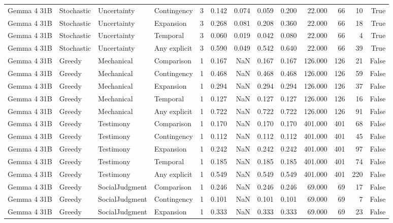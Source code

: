 \begin{tabular}{llllrrrrrrrrr}
Gemma 4 31B & Stochastic & Uncertainty & Contingency & 3 & 0.142 & 0.074 & 0.059 & 0.200 & 22.000 & 66 & 10 & True \\
Gemma 4 31B & Stochastic & Uncertainty & Expansion & 3 & 0.268 & 0.081 & 0.208 & 0.360 & 22.000 & 66 & 18 & True \\
Gemma 4 31B & Stochastic & Uncertainty & Temporal & 3 & 0.060 & 0.019 & 0.042 & 0.080 & 22.000 & 66 & 4 & True \\
Gemma 4 31B & Stochastic & Uncertainty & Any explicit & 3 & 0.590 & 0.049 & 0.542 & 0.640 & 22.000 & 66 & 39 & True \\
Gemma 4 31B & Greedy & Mechanical & Comparison & 1 & 0.167 & NaN & 0.167 & 0.167 & 126.000 & 126 & 21 & False \\
Gemma 4 31B & Greedy & Mechanical & Contingency & 1 & 0.468 & NaN & 0.468 & 0.468 & 126.000 & 126 & 59 & False \\
Gemma 4 31B & Greedy & Mechanical & Expansion & 1 & 0.294 & NaN & 0.294 & 0.294 & 126.000 & 126 & 37 & False \\
Gemma 4 31B & Greedy & Mechanical & Temporal & 1 & 0.127 & NaN & 0.127 & 0.127 & 126.000 & 126 & 16 & False \\
Gemma 4 31B & Greedy & Mechanical & Any explicit & 1 & 0.722 & NaN & 0.722 & 0.722 & 126.000 & 126 & 91 & False \\
Gemma 4 31B & Greedy & Testimony & Comparison & 1 & 0.170 & NaN & 0.170 & 0.170 & 401.000 & 401 & 68 & False \\
Gemma 4 31B & Greedy & Testimony & Contingency & 1 & 0.112 & NaN & 0.112 & 0.112 & 401.000 & 401 & 45 & False \\
Gemma 4 31B & Greedy & Testimony & Expansion & 1 & 0.242 & NaN & 0.242 & 0.242 & 401.000 & 401 & 97 & False \\
Gemma 4 31B & Greedy & Testimony & Temporal & 1 & 0.185 & NaN & 0.185 & 0.185 & 401.000 & 401 & 74 & False \\
Gemma 4 31B & Greedy & Testimony & Any explicit & 1 & 0.549 & NaN & 0.549 & 0.549 & 401.000 & 401 & 220 & False \\
Gemma 4 31B & Greedy & SocialJudgment & Comparison & 1 & 0.246 & NaN & 0.246 & 0.246 & 69.000 & 69 & 17 & False \\
Gemma 4 31B & Greedy & SocialJudgment & Contingency & 1 & 0.101 & NaN & 0.101 & 0.101 & 69.000 & 69 & 7 & False \\
Gemma 4 31B & Greedy & SocialJudgment & Expansion & 1 & 0.333 & NaN & 0.333 & 0.333 & 69.000 & 69 & 23 & False \\

\end{tabular}
